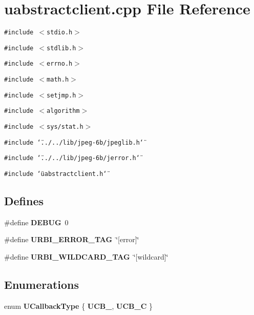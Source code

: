 \section{uabstractclient.cpp File Reference}
\label{uabstractclient_8cpp}
{\tt \#include $<$stdio.h$>$}\par
{\tt \#include $<$stdlib.h$>$}\par
{\tt \#include $<$errno.h$>$}\par
{\tt \#include $<$math.h$>$}\par
{\tt \#include $<$setjmp.h$>$}\par
{\tt \#include $<$algorithm$>$}\par
{\tt \#include $<$sys/stat.h$>$}\par
{\tt \#include \char`\"{}../../lib/jpeg-6b/jpeglib.h\char`\"{}}\par
{\tt \#include \char`\"{}../../lib/jpeg-6b/jerror.h\char`\"{}}\par
{\tt \#include \char`\"{}uabstractclient.h\char`\"{}}\par
\subsection*{Defines}
\begin{CompactItemize}
\item 
\#define {\bf DEBUG}\ 0\label{uabstractclient_8cpp_a0}

\item 
\#define {\bf URBI\_\-ERROR\_\-TAG}\ \char`\"{}[error]\char`\"{}\label{uabstractclient_8cpp_a1}

\item 
\#define {\bf URBI\_\-WILDCARD\_\-TAG}\ \char`\"{}[wildcard]\char`\"{}\label{uabstractclient_8cpp_a2}

\end{CompactItemize}
\subsection*{Enumerations}
\begin{CompactItemize}
\item 
enum {\bf UCallback\-Type} \{ {\bf UCB\_\-}, 
{\bf UCB\_\-C}
 \}
\end{CompactItemize}
